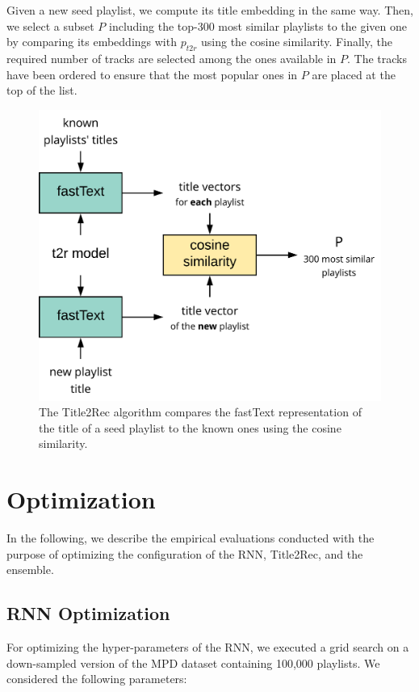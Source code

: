 Given a new seed playlist, we compute its title embedding in the same way. Then, we select a subset $P$ including the top-300 most similar playlists to the given one by comparing its embeddings with $p_{t2r}$ using the cosine similarity. Finally, the required number of tracks are selected among the ones available in $P$. The tracks have been ordered to ensure that the most popular ones in $P$ are placed at the top of the list.

\begin{figure}
\centering
\includegraphics[width=.75\textwidth]{t2r_rec}
\caption[Title2Rec algorithm]{The Title2Rec algorithm compares the fastText representation of the title of a seed playlist to the known ones using the cosine similarity.}
\label{rnn:fig:t2r_rec}
\end{figure}

\section{Optimization}
\label{rnn:sec:optimization}

In the following, we describe the empirical evaluations conducted with the purpose of optimizing the configuration of the RNN, Title2Rec, and the ensemble.

\subsection{RNN Optimization}
\label{rnn:sec:rnn-opt}

For optimizing the hyper-parameters of the RNN, we executed a grid search on a down-sampled version of the MPD dataset containing 100,000 playlists. We considered the following parameters:


